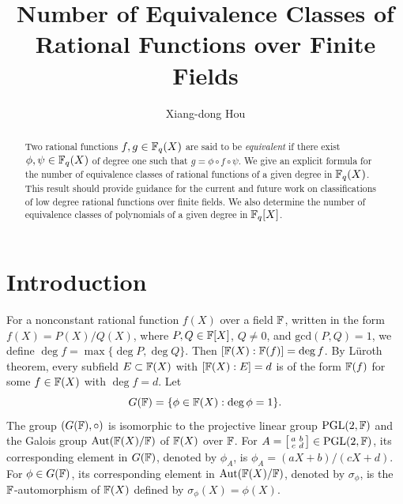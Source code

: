 \documentclass{amsart}
\numberwithin{equation}{section}
\theoremstyle{definition}
\newcommand{\f}{\Bbb F}
\begin{document}
\title[Number of Equivalence Classes of Rational Functions]{Number of Equivalence Classes of Rational Functions over Finite Fields}

\author[Xiang-dong Hou]{Xiang-dong Hou}
\address{Department of Mathematics and Statistics,
University of South Florida, Tampa, FL 33620}



\begin{abstract}
Two rational functions $f,g\in\Bbb F_q(X)$ are said to be {\em equivalent} if there exist $\phi,\psi\in\Bbb F_q(X)$ of degree one such that $g=\phi\circ f\circ\psi$. We give an explicit formula for the number of equivalence classes of rational functions of a given degree in $\Bbb F_q(X)$. This result should provide guidance for the current and future work on classifications of low degree rational functions over finite fields. We also determine the number of equivalence classes of polynomials of a given degree in $\Bbb F_q[X]$.
\end{abstract}

\maketitle

\section{Introduction}

For a nonconstant rational function $f(X)$ over a field $\f$, written in the form $f(X)=P(X)/Q(X)$, where $P,Q\in\f[X]$, $Q\ne 0$, and $\text{gcd}(P,Q)=1$, we define $\deg f=\max\{\deg P,\deg Q\}$. Then $[\f(X):\f(f)]=\deg f$. By L\"uroth theorem, every subfield $E\subset\f(X)$ with $[\f(X):E]=d$ is of the form $\f(f)$ for some $f\in\f(X)$ with $\deg f=d$. Let 
\begin{equation}\label{G(F)}
G(\f)=\{\phi\in\f(X):\deg \phi=1\}.
\end{equation}
The group $(G(\f),\circ)$ is isomorphic to the projective linear group $\text{PGL}(2,\f)$ and the Galois group $\text{Aut}(\f(X)/\f)$ of $\f(X)$ over $\f$. For $A=\left[\begin{smallmatrix}a&b\cr c&d\end{smallmatrix}\right]\in\text{PGL}(2,\f)$, its corresponding element in $G(\f)$, denoted by $\phi_A$, is $\phi_A=(aX+b)/(cX+d)$. For $\phi\in G(\f)$, its corresponding element in $\text{Aut}(\f(X)/\f)$, denoted by $\sigma_\phi$, is the $\f$-automorphism of $\f(X)$ defined by $\sigma_\phi(X)=\phi(X)$.
\end{document}
